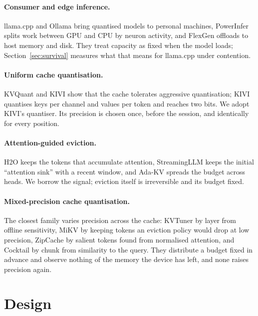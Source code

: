 \documentclass{article}
\begin{document}
\paragraph{Consumer and edge inference.} llama.cpp \citep{llamacpp} and Ollama
\citep{ollama} bring quantised models to personal machines, PowerInfer
\citep{song2024powerinfer} splits work between GPU and CPU by neuron activity,
and FlexGen \citep{sheng2023flexgen} offloads to host memory and disk. They
treat capacity as fixed when the model loads; Section~\ref{sec:survival}
measures what that means for llama.cpp under contention.

\paragraph{Uniform cache quantisation.} KVQuant \citep{hooper2024kvquant} and
KIVI \citep{liu2024kivi} show that the cache tolerates aggressive quantisation;
KIVI quantises keys per channel and values per token and reaches two bits. We
adopt KIVI's quantiser. Its precision is chosen once, before the session, and
identically for every position.

\paragraph{Attention-guided eviction.} H2O \citep{zhang2023h2o} keeps the
tokens that accumulate attention, StreamingLLM \citep{xiao2024streamingllm}
keeps the initial ``attention sink'' with a recent window, and Ada-KV
\citep{feng2024adakv} spreads the budget across heads. We borrow the signal;
eviction itself is irreversible and its budget fixed.

\paragraph{Mixed-precision cache quantisation.} The closest family varies
precision across the cache: KVTuner \citep{kvtuner} by layer from offline
sensitivity, MiKV \citep{yang2024mikv} by keeping tokens an eviction policy
would drop at low precision, ZipCache \citep{he2024zipcache} by salient tokens
found from normalised attention, and Cocktail \citep{tao2025cocktail} by chunk
from similarity to the query. They distribute a budget fixed in advance and
observe nothing of the memory the device has left, and none raises precision
again.

\section{Design}
\label{sec:design}
\end{document}
